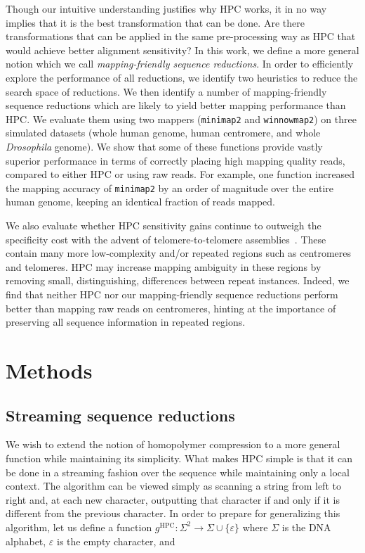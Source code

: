 \documentclass[
  11pt,
  twoside]{scrbook}
\begin{document}
Though our intuitive understanding justifies why HPC works, it in no way implies
that it is the best transformation that can be done. Are there transformations
that can be applied in the same pre-processing way as HPC that would achieve
better alignment sensitivity? In this work, we define a more general notion
which we call \emph{mapping-friendly sequence reductions}. In order to efficiently
explore the performance of all reductions, we identify two heuristics to reduce
the search space of reductions. We then identify a number of mapping-friendly
sequence reductions which are likely to yield better mapping performance than
HPC. We evaluate them using two mappers (\texttt{minimap2} and \texttt{winnowmap2}) on three
simulated datasets (whole human genome, human centromere, and whole \emph{Drosophila}
genome). We show that some of these functions provide vastly superior
performance in terms of correctly placing high mapping quality reads, compared
to either HPC or using raw reads. For example, one function increased the
mapping accuracy of \texttt{minimap2} by an order of magnitude over the entire human
genome, keeping an identical fraction of reads mapped.

We also evaluate whether HPC sensitivity gains continue to outweigh the
specificity cost with the advent of telomere-to-telomere
assemblies~\autocite{nurk2022}. These contain many more
low-complexity and/or repeated regions such as centromeres and telomeres. HPC
may increase mapping ambiguity in these regions by removing small,
distinguishing, differences between repeat instances. Indeed, we find that
neither HPC nor our mapping-friendly sequence reductions perform better than
mapping raw reads on centromeres, hinting at the importance of preserving all
sequence information in repeated regions.

\hypertarget{hpc-methods}{%
\section{Methods}\label{hpc-methods}}

\hypertarget{sec:msr-def}{%
\subsection{Streaming sequence reductions}\label{sec:msr-def}}

We wish to extend the notion of homopolymer compression to a more general
function while maintaining its simplicity. What makes HPC simple is that it can
be done in a streaming fashion over the sequence while maintaining only a local
context. The algorithm can be viewed simply as scanning a string from left to
right and, at each new character, outputting that character if and only if it is
different from the previous character. In order to prepare for generalizing this
algorithm, let us define a function
\(g^\text{HPC} : \Sigma^2\rightarrow\Sigma\cup\{\varepsilon\}\) where \(\Sigma\) is
the DNA alphabet, \(\varepsilon\) is the empty character, and
\end{document}
